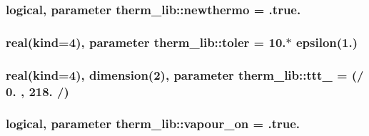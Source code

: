 \subsubsection[{newthermo}]{\setlength{\rightskip}{0pt plus 5cm}logical, parameter therm\+\_\+lib\+::newthermo = .true.}\label{namespacetherm__lib_ac36c121987554589b16d515ddc351939}
\hypertarget{namespacetherm__lib_a4855f01e51a3fcf9e35d4f7d17156819}{}
\subsubsection[{toler}]{\setlength{\rightskip}{0pt plus 5cm}real(kind=4), parameter therm\+\_\+lib\+::toler = 10.$\ast$ epsilon(1.)}\label{namespacetherm__lib_a4855f01e51a3fcf9e35d4f7d17156819}
\hypertarget{namespacetherm__lib_afb689f706983009dfc62f3f4d0f85dc7}{}
\subsubsection[{ttt\+\_\+10}]{\setlength{\rightskip}{0pt plus 5cm}real(kind=4), dimension(2), parameter therm\+\_\+lib\+::ttt\+\_ = (/ 0. , 218. /)}\label{namespacetherm__lib_afb689f706983009dfc62f3f4d0f85dc7}
\hypertarget{namespacetherm__lib_a7c4a4113d6d2548dd389c9eefce0396e}{}
\subsubsection[{vapour\+\_\+on}]{\setlength{\rightskip}{0pt plus 5cm}logical, parameter therm\+\_\+lib\+::vapour\+\_\+on = .true.}\label{namespacetherm__lib_a7c4a4113d6d2548dd389c9eefce0396e}
